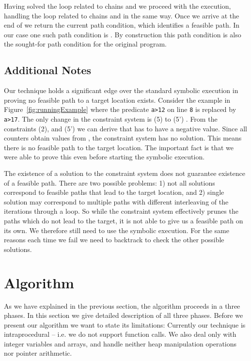 \documentclass{llncs}
\begin{document}
Having solved the loop related to chains  and  we proceed with the
execution, handling the loop related to chains  and  in the same
way. Once we arrive at the end of  we return the current path condition,
which identifies a feasible path. In our case one such path condition is 
.
By construction this path condition is also the sought-for path condition
for the original program.

\subsection{Additional Notes}
\label{sec:OverviewNotes}

Our technique holds a significant edge over the standard symbolic execution
in proving no feasible path to a target location exists. Consider the
example in Figure~\ref{fig:runningExample} where the predicate \texttt{a>12}
on line \texttt{8} is replaced by \texttt{a>17}. 
The only change in the constraint system is (5) to (5') . 
From the constraints (2), and (5') we can derive that 
has to have a negative value. Since all counters obtain values from , the constraint system has no solution. This means
there is no feasible path to the target location. The important fact is that
we were able to prove this even before starting the symbolic execution. 

The existence of a solution to the constraint system does not guarantee
existence of a feasible path. There are two possible problems: 1) not all
solutions correspond to feasible paths that lead to the target location, and
2) single solution may correspond to multiple paths with different
interleaving of the iterations through a loop.  So while the constraint
system effectively prunes the paths which do not lead to the target, it is
not able to give us a feasible path on its own. We therefore still need to
use the symbolic execution. For the same reasons each time we fail we need
to backtrack to check the other possible solutions.


\section{Algorithm}
\label{sec:Algorithm}

As we have explained in the previous section, the algorithm proceeds in a
three phases. 
In this section we give detailed description
of all three phases. 
Before we present our algorithm we want to state its limitations:
Currently our technique is intraprocedural -- i.e. we do not
support function calls.  We also deal only with integer variables and
arrays, and handle neither heap manipulation operations nor pointer
arithmetic.
\end{document}
